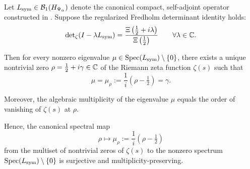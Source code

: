 \begin{lemma}
\label{lem:spectral_exhaustivity}
Let \( L_{\mathrm{sym}} \in \mathcal{B}_1(H_{\Psi_\alpha}) \) denote the canonical compact, self-adjoint operator constructed in . Suppose the regularized Fredholm determinant identity holds:
\[
\det\nolimits_{\zeta}(I - \lambda L_{\mathrm{sym}}) = \frac{\Xi\left(\tfrac{1}{2} + i\lambda\right)}{\Xi\left(\tfrac{1}{2}\right)} \qquad \forall \lambda \in \mathbb{C}.
\]

Then for every nonzero eigenvalue \( \mu \in \operatorname{Spec}(L_{\mathrm{sym}}) \setminus \{0\} \), there exists a unique nontrivial zero \( \rho = \tfrac{1}{2} + i\gamma \in \mathbb{C} \) of the Riemann zeta function \( \zeta(s) \) such that
\[
\mu = \mu_\rho := \frac{1}{i}(\rho - \tfrac{1}{2}) = \gamma.
\]

Moreover, the algebraic multiplicity of the eigenvalue \( \mu \) equals the order of vanishing of \( \zeta(s) \) at \( \rho \).

\medskip
\noindent
Hence, the canonical spectral map
\[
\rho \longmapsto \mu_\rho := \frac{1}{i}(\rho - \tfrac{1}{2})
\]
from the multiset of nontrivial zeros of \( \zeta(s) \) to the nonzero spectrum \( \operatorname{Spec}(L_{\mathrm{sym}}) \setminus \{0\} \) is surjective and multiplicity-preserving.
\end{lemma}
